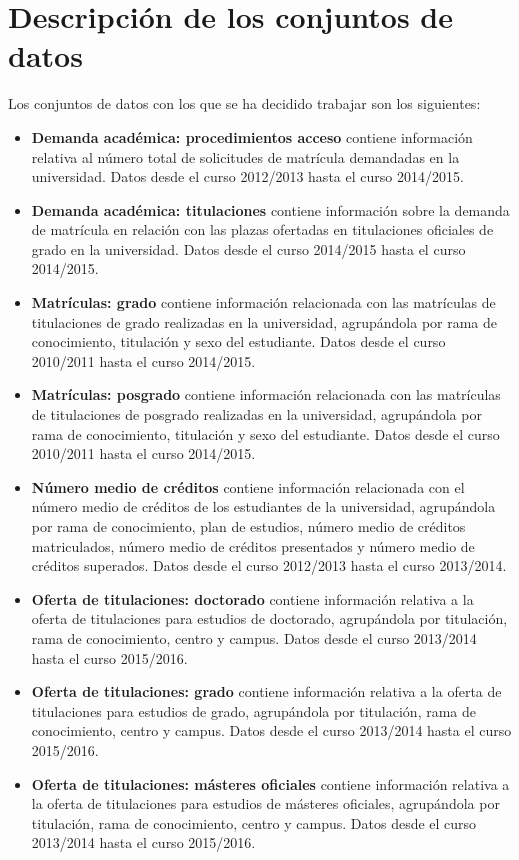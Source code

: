 \section{Descripción de los conjuntos de datos}

Los conjuntos de datos con los que se ha decidido trabajar son los siguientes:

\begin{itemize}
	\item \textbf{Demanda académica: procedimientos acceso} contiene información relativa al número total de solicitudes de matrícula demandadas en la universidad. Datos desde el curso 2012/2013 hasta el curso 2014/2015.
	\item \textbf{Demanda académica: titulaciones} contiene información sobre la demanda de matrícula en relación con las plazas ofertadas en titulaciones oficiales de grado en la universidad. Datos desde el curso 2014/2015 hasta el curso 2014/2015.
	\item \textbf{Matrículas: grado} contiene información relacionada con las matrículas de titulaciones de grado realizadas en la universidad, agrupándola por rama de conocimiento, titulación y sexo del estudiante. Datos desde el curso 2010/2011 hasta el curso 2014/2015.
	\item \textbf{Matrículas: posgrado} contiene información relacionada con las matrículas de titulaciones de posgrado realizadas en la universidad, agrupándola por rama de conocimiento, titulación y sexo del estudiante. Datos desde el curso 2010/2011 hasta el curso 2014/2015.
	\item \textbf{Número medio de créditos} contiene información relacionada con el número medio de créditos de los estudiantes de la universidad, agrupándola por rama de conocimiento, plan de estudios, número medio de créditos matriculados, número medio de créditos presentados y número medio de créditos superados. Datos desde el curso 2012/2013 hasta el curso 2013/2014.
	\item \textbf{Oferta de titulaciones: doctorado} contiene información relativa a la oferta de titulaciones para estudios de doctorado, agrupándola por titulación, rama de conocimiento, centro y campus. Datos desde el curso 2013/2014 hasta el curso 2015/2016.
	\item \textbf{Oferta de titulaciones: grado} contiene información relativa a la oferta de titulaciones para estudios de grado, agrupándola por titulación, rama de conocimiento, centro y campus. Datos desde el curso 2013/2014 hasta el curso 2015/2016.
	\item \textbf{Oferta de titulaciones: másteres oficiales} contiene información relativa a la oferta de titulaciones para estudios de másteres oficiales, agrupándola por titulación, rama de conocimiento, centro y campus. Datos desde el curso 2013/2014 hasta el curso 2015/2016.

\end{itemize}
